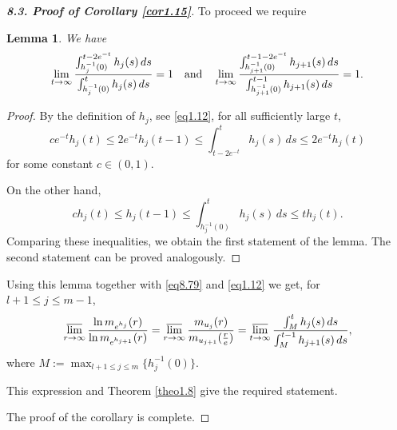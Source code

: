\documentclass[11pt, oneside]{amsart}
\newtheorem{Lm}[Th]{Lemma}
\begin{document}
\begin{proof}[{\bf 8.3. Proof of Corollary \ref{cor1.15}}]
To proceed we require
\begin{Lm}\label{lem8.1}
We have
\[
 \lim_{t\rightarrow\infty}\frac{\int_{h_{j}^{-1}(0)}^{t-2e^{-t}} h_{j}(s)\,ds}{\int_{h_{j}^{-1}(0)}^{t} h_{j}(s)\,ds}=1\quad {\rm and}\quad \lim_{t\rightarrow\infty}\frac{\int_{h_{j+1}^{-1}(0)}^{t-1-2e^{-t}} h_{j+1}(s)\,ds}{\int_{h_{j+1}^{-1}(0)}^{t-1} h_{j+1}(s)\,ds}=1.
\]
\end{Lm}
\begin{proof}
By the definition of $h_j$, see \eqref{eq1.12}, for all sufficiently large $t$,
\[
ce^{-t}h_j(t)\le 2e^{-t}h_j(t-1)\le \int_{t-2e^{-t}}^t h_{j}(s)\,ds\le 2e^{-t}h_j(t)
\]
for some constant $c\in (0,1)$.

On the other hand,
\[
ch_j(t)\le h_j(t-1)\le\int_{h_{j}^{-1}(0)}^{t} h_{j}(s)\,ds\le t h_j(t).
\]
Comparing these inequalities, we obtain the first statement of the lemma. The second statement can be proved analogously.
\end{proof}

Using this lemma together with \eqref{eq8.79} and \eqref{eq1.12} we get, for $l+1\le j\le m-1$,
\[
\varlimsup_{r\rightarrow\infty}\frac{\ln m_{e^{h_j}}(r)}{\ln m_{e^{h_{j+1}}}(r)}=\varlimsup_{r\rightarrow\infty}\frac{m_{u_j}(r)}{m_{u_{j+1}}(\frac re)}=\varlimsup_{t\rightarrow\infty}\frac{\int_{M}^{t} h_{j}(s)\,ds}{\int_{M}^{t-1} h_{j+1}(s)\,ds},
\]
where $M:=\max_{l+1\le j\le m}\{h_j^{-1}(0)\}$.

This expression and Theorem \ref{theo1.8} give the required statement.

The proof of the corollary is complete.
\end{proof}
\end{document}
